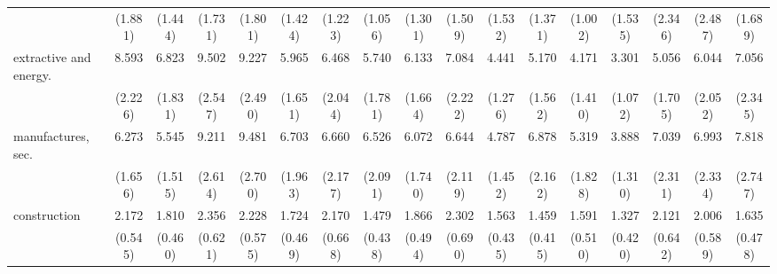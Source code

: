 {\begin{tabular}{l*{16}{c}}
                    &     (1.881)         &     (1.444)         &     (1.731)         &     (1.801)         &     (1.424)         &     (1.223)         &     (1.056)         &     (1.301)         &     (1.509)         &     (1.532)         &     (1.371)         &     (1.002)         &     (1.535)         &     (2.346)         &     (2.487)         &     (1.689)         \\
[1em]
extractive and energy.&       8.593\sym{***}&       6.823\sym{***}&       9.502\sym{***}&       9.227\sym{***}&       5.965\sym{***}&       6.468\sym{***}&       5.740\sym{***}&       6.133\sym{***}&       7.084\sym{***}&       4.441\sym{***}&       5.170\sym{***}&       4.171\sym{***}&       3.301\sym{***}&       5.056\sym{***}&       6.044\sym{***}&       7.056\sym{***}\\
                    &     (2.226)         &     (1.831)         &     (2.547)         &     (2.490)         &     (1.651)         &     (2.044)         &     (1.781)         &     (1.664)         &     (2.222)         &     (1.276)         &     (1.562)         &     (1.410)         &     (1.072)         &     (1.705)         &     (2.052)         &     (2.345)         \\
[1em]
manufactures, sec.  &       6.273\sym{***}&       5.545\sym{***}&       9.211\sym{***}&       9.481\sym{***}&       6.703\sym{***}&       6.660\sym{***}&       6.526\sym{***}&       6.072\sym{***}&       6.644\sym{***}&       4.787\sym{***}&       6.878\sym{***}&       5.319\sym{***}&       3.888\sym{***}&       7.039\sym{***}&       6.993\sym{***}&       7.818\sym{***}\\
                    &     (1.656)         &     (1.515)         &     (2.614)         &     (2.700)         &     (1.963)         &     (2.177)         &     (2.091)         &     (1.740)         &     (2.119)         &     (1.452)         &     (2.162)         &     (1.828)         &     (1.310)         &     (2.311)         &     (2.334)         &     (2.747)         \\
[1em]
construction        &       2.172\sym{**} &       1.810\sym{*}  &       2.356\sym{**} &       2.228\sym{**} &       1.724\sym{*}  &       2.170\sym{*}  &       1.479         &       1.866\sym{*}  &       2.302\sym{**} &       1.563         &       1.459         &       1.591         &       1.327         &       2.121\sym{*}  &       2.006\sym{*}  &       1.635         \\
                    &     (0.545)         &     (0.460)         &     (0.621)         &     (0.575)         &     (0.469)         &     (0.668)         &     (0.438)         &     (0.494)         &     (0.690)         &     (0.435)         &     (0.415)         &     (0.510)         &     (0.420)         &     (0.642)         &     (0.589)         &     (0.478)         \\

\end{tabular}}
